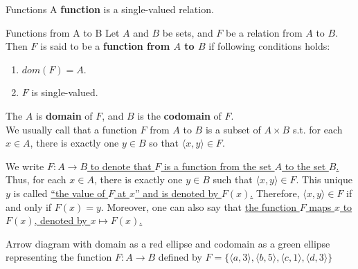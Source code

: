 \begin{definition}{Functions}{}
    A \textbf{function} is a single-valued relation.
\end{definition}

\begin{definition}{Functions from A to B}{}
    Let $A$ and $B$ be sets, and $F$ be a relation from $A$ to $B$. Then $F$ is 
    said to be a \textbf{function from $A$ to $B$} if following conditions holds:
    \begin{enumerate}

        \item $dom(F) = A$.
        \item $F$ is single-valued.

    \end{enumerate}
    The $A$ is \textbf{domain} of $F$, and $B$ is the \textbf{codomain} of $F$.\\
    We usually call that a function $F$ from $A$ to $B$ is a subset of $A \times B$ s.t. for each $x \in A$, there is exactly one $y \in B$ so that $\langle x,y \rangle \in F$.
\end{definition}

We write \underline{$F : A \to B$ to denote that $F$ is a function from the set $A$ to the set $B$.} Thus, for each $x \in A$, there is exactly one $y \in B$ such that $\langle x, y \rangle \in F$. This unique $y$ is called \underline{“the value of $F$ at $x$” and is denoted by $F(x)$.} Therefore, $\langle x, y \rangle \in F$ if and only if $F(x) = y$.
Moreover, one can also say that \underline{the function $F$ maps $x$ to $F(x)$, denoted by $x \mapsto F(x)$.} 

\begin{examples}
    Arrow diagram with domain as a red ellipse and codomain as a green ellipse representing the function \( F: A \to B \) defined by \( F = \{\langle a, 3 \rangle, \langle b, 5 \rangle, \langle c, 1 \rangle, \langle d, 3 \rangle\} \)
\end{examples}

